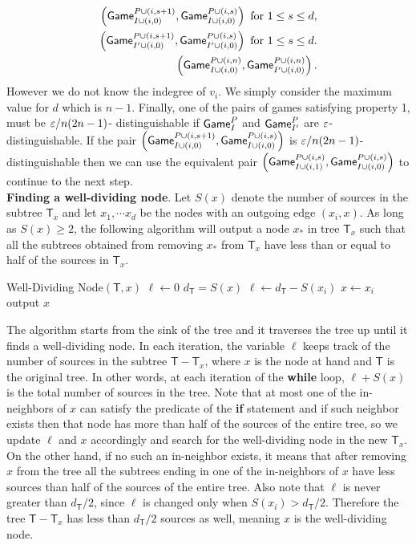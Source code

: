\documentclass{article}
\newcommand{\game}{{\sf Game}}
\newcommand{\T}{{\mathsf T}}
\newcommand{\dgg}[2]{\game_{#1}^{#2}}
\begin{document}
\begin{align*}
\rob{\dgg{I\cup (i,0)}{P\cup (i,s+1)},\dgg{I\cup (i,0)}{P\cup (i,s)} }\text{ for } 1\leq s \leq d,  \\ 
\rob{\dgg{I'\cup (i,0)}{P\cup (i,s+1)},\dgg{I'\cup (i,0)}{P\cup (i,s)}} \text{ for } 1\leq s \leq d.  \\
\rob{\dgg{I\cup (i,0)}{P\cup (i,n)},\dgg{I'\cup (i,0)}{P\cup (i,n)}}.
\end{align*}
However we do not know the indegree of $v_i$. We simply consider the maximum value for $d$ which is $n-1$. Finally, one of the pairs of games satisfying property 1, must be $\varepsilon/n(2n-1)$- distinguishable if $\dgg{I}{P}$ and $\dgg{I'}{P}$ are $\varepsilon$- distinguishable.  If the pair $\rob{\dgg{I\cup (i,0)}{P\cup (i,s+1)},\dgg{I\cup (i,0)}{P\cup (i,s)} }$ is $\varepsilon/n(2n-1)$-distinguishable then we can use the equivalent pair $\rob{\dgg{I\cup (i,1)}{P\cup (i,s)},\dgg{I\cup (i,0)}{P\cup (i,s)} }$ to continue to the next step.\\

  \textbf{Finding a well-dividing node}.
Let $S(x)$ denote the number of sources in the subtree $\T_x$ and let $x_1, \cdots x_d$  be the nodes with an outgoing edge $(x_i,x)$. As long as $S(x)\geq 2$, the following algorithm will output a node $x_*$ in tree $\T_x$ such that  all the subtrees obtained from removing $x_*$ from $\T_x$ have less than or equal to half of the sources in $\T_x$.

\hspace{2mm}
\begin{algorithmic}
\State Well-Dividing Node$(\T,x)$
\State $\ell \gets 0$ 
\State $d_{\T}=S(x)$
	\If {$\exists i,S(x_i)>d_{\T}/2$}
 	   \State $\ell\gets d_{\T}-S(x_i)$ 
 	   \State $x \gets x_i$
	\Else
	\EndIf
\EndWhile
\State output $x$
\end{algorithmic}
\hspace{1mm}

The algorithm starts from the sink of the tree and it traverses the tree up until it finds a well-dividing node. In each iteration, the variable $\ell$ keeps track of the number of sources in the subtree $\T-\T_x$, where $x$ is the node at hand and $\T$ is the original tree. In other words, at each iteration of the \textbf{while} loop, $\ell + S(x)$ is the total number of sources in the tree. Note that at most one of the in-neighbors of $x$ can satisfy the predicate of the \textbf{if} statement and if such neighbor exists then that node has more than half of the sources of the entire tree, so we update $\ell$ and $x$ accordingly and search for the well-dividing node in the new $\T_x$. On the other hand, if no such an in-neighbor exists, it means that after removing $x$ from the tree all the subtrees ending in one of the in-neighbors of $x$ have less sources than half of the sources of the entire tree. Also note that $\ell$ is never greater than $d_{\T}/2$, since $\ell$ is changed only when $S(x_i)>d_{\T}/2$. Therefore the tree $\T-\T_x$ has less than $d_{\T}/2$ sources as well, meaning $x$ is the well-dividing node.
\end{document}
